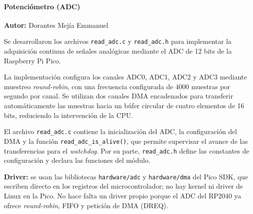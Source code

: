 \paragraph{Potenciómetro (ADC)}
\textbf{Autor:} Dorantes Mejía Emmanuel

Se desarrollaron los archivos \texttt{read\_adc.c} y \texttt{read\_adc.h} para implementar la adquisición continua de
señales analógicas mediante el ADC de 12 bits de la Raspberry Pi Pico.

La implementación configura los canales ADC0, ADC1, ADC2 y ADC3 mediante muestreo \textit{round-robin}, con una
frecuencia configurada de 4000 muestras por segundo por canal. Se utilizan dos canales DMA encadenados para transferir
automáticamente las muestras hacia un búfer circular de cuatro elementos de 16 bits, reduciendo la intervención de la CPU.

El archivo \texttt{read\_adc.c} contiene la inicialización del ADC, la configuración del DMA y la función
\texttt{read\_adc\_is\_alive()}, que permite supervisar el avance de las transferencias para el \textit{watchdog}.
Por su parte, \texttt{read\_adc.h} define las constantes de configuración y declara las funciones del módulo.

\textbf{Driver:} se usan las bibliotecas \texttt{hardware/adc} y \texttt{hardware/dma} del Pico SDK, que escriben
directo en los registros del microcontrolador; no hay kernel ni driver de Linux en la Pico. No hace falta un driver
propio porque el ADC del RP2040 ya ofrece \textit{round-robin}, FIFO y petición de DMA (DREQ).

